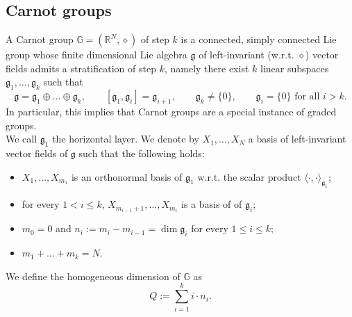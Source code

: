 \documentclass[11pt]{amsart}
\numberwithin{equation}{section} %
\theoremstyle{definition}
\begin{document}
\subsection{Carnot groups}
A Carnot group $\mathbb{G}=(\mathbb{R}^{N},\diamond)$ of step $k$ is a connected, simply connected Lie group whose finite dimensional Lie algebra $\mathfrak{g}$ of left-invariant (w.r.t. $\diamond$) vector fields admits a stratification of step $k$, namely there exist $k$ linear subspaces $\mathfrak{g}_1, \ldots, \mathfrak{g}_k$ such that
\begin{equation*}
	\mathfrak{g} = \mathfrak{g}_{1}\oplus \ldots \oplus \mathfrak{g}_{k}, \qquad [\mathfrak{g}_1,\mathfrak{g}_i]=\mathfrak{g}_{i+1}, \qquad \mathfrak{g}_{k}\neq \{0\}, \qquad \mathfrak{g}_i = \{0\} \textrm{ for all } i>k.
\end{equation*}
In particular, this implies that Carnot groups are a special instance of graded groups.\\
We call $\mathfrak{g}_1$ the horizontal layer. We denote by $X_1, \ldots, X_{N}$ a basis of left-invariant vector fields of $\mathfrak{g}$ such that the following holds:
\begin{itemize}
	\item $X_1, \ldots, X_{m_1}$ is an orthonormal basis of $\mathfrak{g}_{1}$ w.r.t. the scalar product $\langle \cdot, \cdot \rangle_{\mathfrak{g}_{1}}$;
	\item for every $1<i\leq k$, $X_{m_{i-1}+1},\ldots, X_{m_{i}}$ is a basis of of $\mathfrak{g}_{i}$;
	\item $m_{0}=0$ and $n_i := m_{i}-m_{i-1} = \dim \mathfrak{g}_i$ for every $1\leq i\leq k$;
	\item $m_1 + \ldots + m_k = N$.
\end{itemize}
We define the homogeneous dimension of $\mathbb{G}$ as
\begin{equation*}%
	Q:= \sum_{i=1}^{k}i \cdot n_{i}.
\end{equation*}
\end{document}
